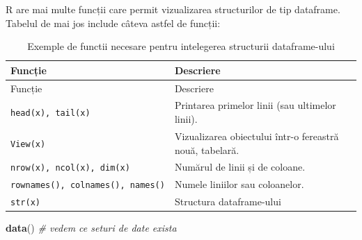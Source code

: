 \documentclass[]{article}
\newenvironment{Shaded}{\begin{snugshade}}{\end{snugshade}}
\newcommand{\CommentTok}[1]{\textcolor[rgb]{0.56,0.35,0.01}{\textit{#1}}}
\newcommand{\KeywordTok}[1]{\textcolor[rgb]{0.13,0.29,0.53}{\textbf{#1}}}
\newcommand{\NormalTok}[1]{#1}
\begin{document}
R are mai multe funcții care permit vizualizarea structurilor de tip
dataframe. Tabelul de mai jos include câteva astfel de funcții:

\begin{longtable}[]{@{}ll@{}}
\caption{Exemple de functii necesare pentru intelegerea structurii
dataframe-ului}\tabularnewline
\toprule
Funcție & Descriere\tabularnewline
\midrule
\endfirsthead
\toprule
Funcție & Descriere\tabularnewline
\midrule
\endhead
\texttt{head(x),\ tail(x)} & Printarea primelor linii (sau ultimelor
linii).\tabularnewline
\texttt{View(x)} & Vizualizarea obiectului într-o fereastră nouă,
tabelară.\tabularnewline
\texttt{nrow(x),\ ncol(x),\ dim(x)} & Numărul de linii și de
coloane.\tabularnewline
\texttt{rownames(),\ colnames(),\ names()} & Numele liniilor sau
coloanelor.\tabularnewline
\texttt{str(x)} & Structura dataframe-ului\tabularnewline
\bottomrule
\end{longtable}

\begin{Shaded}
\begin{Highlighting}[]
\KeywordTok{data}\NormalTok{() }\CommentTok{# vedem ce seturi de date exista}
\end{Highlighting}
\end{Shaded}
\end{document}
